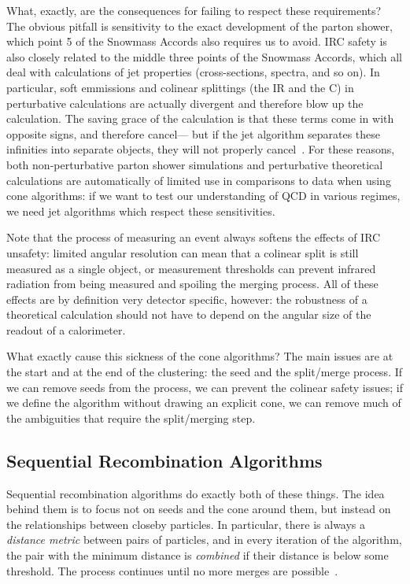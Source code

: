 What, exactly, are the consequences for failing to respect these requirements? The obvious pitfall is sensitivity to the exact development of the parton shower, which point 5 of the Snowmass Accords also requires us to avoid. IRC safety is also closely related to the middle three points of the Snowmass Accords, which all deal with calculations of jet properties (cross-sections, \pt spectra, and so on). In particular, soft emmissions and colinear splittings (the IR and the C) in perturbative calculations are actually divergent and therefore blow up the calculation. The saving grace of the calculation is that these terms come in with opposite signs, and therefore cancel--- but if the jet algorithm separates these infinities into separate objects, they will not properly cancel~\cite{Jetography}. For these reasons, both non-perturbative parton shower simulations and perturbative theoretical calculations are automatically of limited use in comparisons to data when using cone algorithms: if we want to test our understanding of QCD in various regimes, we need jet algorithms which respect these sensitivities.

Note that the process of measuring an event always softens the effects of IRC unsafety: limited angular resolution can mean that a colinear split is still measured as a single object, or measurement thresholds can prevent infrared radiation from being measured and spoiling the merging process. All of these effects are by definition very detector specific, however: the robustness of a theoretical calculation should not have to depend on the angular size of the readout of a calorimeter.

What exactly cause this sickness of the cone algorithms? The main issues are at the start and at the end of the clustering: the seed and the split/merge process. If we can remove seeds from the process, we can prevent the colinear safety issues; if we define the algorithm without drawing an explicit cone, we can remove much of the ambiguities that require the split/merging step.

\subsection{Sequential Recombination Algorithms}
\label{chapter:jets-and-substructure:sequential}


Sequential recombination algorithms do exactly both of these things. The idea behind them is to focus not on seeds and the cone around them, but instead on the relationships between closeby particles. In particular, there is always a \textit{distance metric} between pairs of particles, and in every iteration of the algorithm, the pair with the minimum distance is \textit{combined} if their distance is below some threshold. The process continues until no more merges are possible~\cite{Jetography}.

